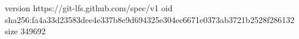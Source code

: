 version https://git-lfs.github.com/spec/v1
oid sha256:fa4a33d23583dee4e337b8e9d694325e304ec6671e0373ab3721b2528f286132
size 349692
